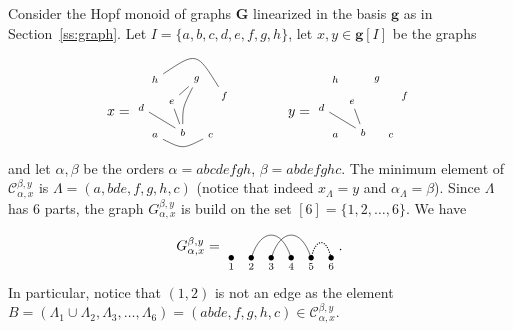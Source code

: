 \documentclass[ALCO,ThmDefs,Unicode,epreuves]{cedram}
\newcommand{\bG}{\mathbf{G}}
\begin{document}
\begin{exam}\label{ex:LxHgraph}
Consider the Hopf monoid of graphs $\bG$ linearized in the basis $\mathbf{g}$ as in Section~\ref{ss:graph}.
Let $I= \{a,b,c,d,e,f,g,h\}$, let $x,y\in\mathbf{g}[I]$ be the graphs
$$
x=
\begin{tikzpicture}[scale=.7,baseline=.5cm]
	\node (a) at (0,0) {$\scriptstyle a$};
	\node (b) at (1,.1) {$\scriptstyle b$};
	\node (c) at (2,0) {$\scriptstyle c$};
	\node (d) at (-.5,1) {$\scriptstyle d$};
	\node (e) at (.6,1.2) {$\scriptstyle e$};
	\node (h) at (0,2) {$\scriptstyle h$};
	\node (g) at (1.5,2) {$\scriptstyle g$};
	\node (f) at (2.5,1.4) {$\scriptstyle f$};
	\draw (a) .. controls (1,-.5) .. (c); 
	\draw (b) .. controls (1,1) .. (g); 
	\draw (h) .. controls (1.5,3) .. (f); 
	\draw (g) -- (e); 
	\draw (b) -- (e); 
	\draw (d) -- (b); 
\end{tikzpicture} 
\qquad \qquad
y=
\begin{tikzpicture}[scale=.7,baseline=.5cm]
	\node (a) at (0,0) {$\scriptstyle a$};
	\node (b) at (1,.1) {$\scriptstyle b$};
	\node (c) at (2,0) {$\scriptstyle c$};
	\node (d) at (-.5,1) {$\scriptstyle d$};
	\node (e) at (.6,1.2) {$\scriptstyle e$};
	\node (h) at (0,2) {$\scriptstyle h$};
	\node (g) at (1.5,2) {$\scriptstyle g$};
	\node (f) at (2.5,1.4) {$\scriptstyle f$};
	\draw (b) -- (e); 
	\draw (d) -- (b); 
\end{tikzpicture} 
$$
and let $\alpha,\beta$ be the orders $\alpha=abcdefgh$, $\beta=abdefghc$. The minimum element of $\mathcal{C}_{\alpha,x}^{\beta,y}$
is $\Lambda=(a,bde,f,g,h,c)$ (notice that indeed $x_{\Lambda}=y$ and $\alpha_{\Lambda}=\beta$). Since $\Lambda$ has $6$ parts, the graph $G_{\alpha,x}^{\beta,y}$ is build on the set $[6]=\{1,2,\ldots,6\}$.
We have 
$$G_{\alpha,x}^{\beta,y}=
\begin{tikzpicture}[baseline=.2cm]
	\foreach \x in {1,2,3,4,5,6} 
		\node (\x) at (\x/2,0) [inner sep=-1pt] {$\bullet$};
	\node at (1/2,-.2) {$\scriptstyle 1$};
	\node at (2/2,-.2) {$\scriptstyle 2$};
	\node at (3/2,-.2) {$\scriptstyle 3$};
	\node at (4/2,-.2) {$\scriptstyle 4$};
	\node at (5/2,-.2) {$\scriptstyle 5$};
	\node at (6/2,-.2) {$\scriptstyle 6$};
	\draw (2) .. controls (2.5/2,.75) and (3.5/2,.75) .. (4); 
	\draw (3) .. controls (3.5/2,.75) and (4.5/2,.75) .. (5); 
	\draw [densely dotted,thick] (5) .. controls (5.25/2,.5) and (5.75/2,.5) .. (6); 
\end{tikzpicture} .
$$
In particular, notice that $(1,2)$ is not an edge as the element $B=(\Lambda_1\cup\Lambda_2,\Lambda_3,\dots,\Lambda_6)=(abde,f,g,h,c)\in \mathcal{C}_{\alpha,x}^{\beta,y}$.

\end{exam}
\end{document}
